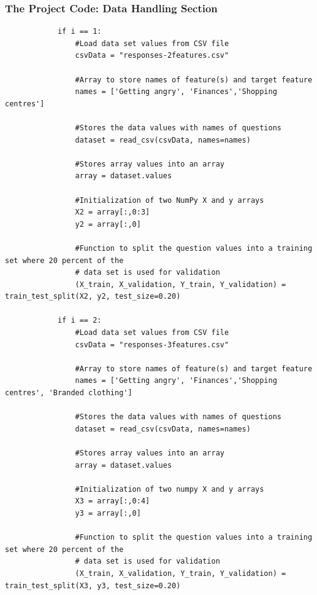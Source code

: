 \documentclass{beamer}
\begin{document}
\begin{frame}[fragile]
\frametitle{The Project Code: Data Handling Section}

\fontsize{6}{5}
\begin{verbatim}
            if i == 1:
                #Load data set values from CSV file
                csvData = "responses-2features.csv"    

                #Array to store names of feature(s) and target feature
                names = ['Getting angry', 'Finances','Shopping centres']
    
                #Stores the data values with names of questions
                dataset = read_csv(csvData, names=names)

                #Stores array values into an array
                array = dataset.values

                #Initialization of two NumPy X and y arrays
                X2 = array[:,0:3]
                y2 = array[:,0]

                #Function to split the question values into a training set where 20 percent of the 
                # data set is used for validation
                (X_train, X_validation, Y_train, Y_validation) = train_test_split(X2, y2, test_size=0.20)

            if i == 2:
                #Load data set values from CSV file
                csvData = "responses-3features.csv"    

                #Array to store names of feature(s) and target feature
                names = ['Getting angry', 'Finances','Shopping centres', 'Branded clothing']
    
                #Stores the data values with names of questions
                dataset = read_csv(csvData, names=names)

                #Stores array values into an array
                array = dataset.values

                #Initialization of two numpy X and y arrays
                X3 = array[:,0:4]
                y3 = array[:,0]

                #Function to split the question values into a training set where 20 percent of the 
                # data set is used for validation
                (X_train, X_validation, Y_train, Y_validation) = train_test_split(X3, y3, test_size=0.20)


\end{verbatim}
\end{frame}
\end{document}
